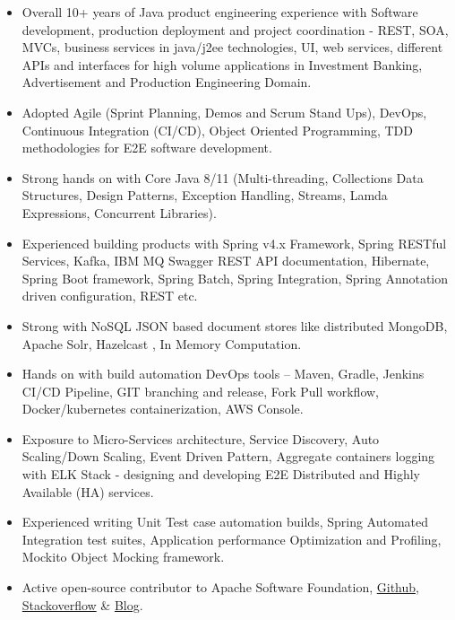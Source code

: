 \documentclass[10pt,A4]{article}
\begin{document}
\begin{itemize}
\item Overall 10+ years of Java product engineering experience with Software development, 
production deployment and project coordination - REST, SOA,
MVCs, business services in java/j2ee technologies, UI, web services, different APIs and
interfaces for high volume applications in Investment Banking, Advertisement and Production Engineering Domain.

\item Adopted Agile (Sprint Planning, Demos and Scrum Stand Ups), DevOps, Continuous Integration (CI/CD),
Object Oriented Programming, TDD methodologies for E2E software development.

\item Strong hands on with Core Java 8/11 (Multi-threading, Collections Data Structures, Design Patterns,
Exception Handling, Streams, Lamda Expressions, Concurrent Libraries).

\item Experienced building products with Spring v4.x Framework, Spring RESTful Services, Kafka, IBM MQ
Swagger REST API documentation, Hibernate, Spring Boot framework, Spring Batch, Spring Integration, 
Spring Annotation driven configuration, REST etc.

\item Strong with NoSQL JSON based document stores like distributed MongoDB, Apache Solr, Hazelcast , In Memory Computation.

\item Hands on with build automation DevOps tools – Maven, Gradle, Jenkins CI/CD Pipeline, GIT branching
and release, Fork Pull workflow, Docker/kubernetes containerization, AWS Console.

\item Exposure to Micro-Services architecture, Service Discovery, Auto Scaling/Down Scaling, Event Driven
Pattern, Aggregate containers logging with ELK Stack - designing and developing E2E Distributed and
Highly Available (HA) services.

\item Experienced writing Unit Test case automation builds, Spring Automated Integration test suites,
Application performance Optimization and Profiling, Mockito Object Mocking framework.

\item Active open-source contributor to Apache Software Foundation, \href{http://github.com/ameyjadiye/}{Github}, \href{https://stackoverflow.com/users/2664649/amey-jadiye}{Stackoverflow} \& \href{http://codeinventory.com}{Blog}.
\end{itemize} 
\end{document}
